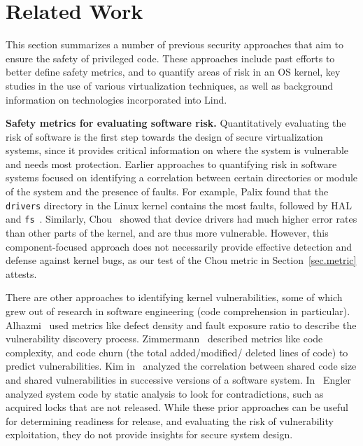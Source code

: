 \section{Related Work}
\label{sec.related_work}

This section summarizes a number of previous security approaches
that aim to ensure the safety of privileged code. %
These approaches include past efforts to better define safety metrics, and to quantify
areas of risk in an OS kernel, key studies in the use of various virtualization 
techniques, as well as background information on technologies incorporated into Lind.

\textbf{Safety metrics for evaluating software risk.}
Quantitatively evaluating the risk of software is the first step towards the design of secure virtualization systems, 
since it provides critical information on where the system is vulnerable and needs most protection. 
Earlier approaches to quantifying risk
in software systems focused on identifying a correlation between 
certain directories or module of the system and the presence of faults. For example,
Palix found that the \texttt{drivers} directory in the Linux kernel contains the
most faults, followed by HAL and \texttt{fs}~\cite{palix2011faults}. Similarly,
Chou~\cite{PittSFIeld} showed that device drivers had
much higher error rates than other parts of the kernel, and are thus more vulnerable.
However, this component-focused approach does not necessarily
provide effective detection and defense against kernel bugs, as our
test of the Chou metric in Section~\ref{sec.metric} attests.


There are other approaches to identifying kernel vulnerabilities, some of
which grew out of research in software engineering (code comprehension
in particular). Alhazmi~\cite{alhazmi2008application}
used metrics like defect density and fault exposure ratio to describe the
vulnerability discovery process. Zimmermann~\cite{zimmermann2010searching}
described metrics like code complexity, and code churn (the total added/modified/
deleted lines of code) to predict vulnerabilities. Kim in~\cite{kim2007vulnerability} analyzed
the correlation between shared code size and shared vulnerabilities in
successive versions of a software system. In~\cite{engler2001bugs} Engler analyzed
system code by static analysis to look for contradictions, such as acquired locks that are
not released. While
these prior approaches can be useful for determining readiness for release, and
evaluating the risk of vulnerability exploitation,
they do not provide insights for secure system design.

